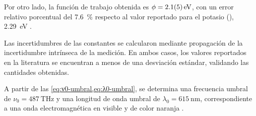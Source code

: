 Por otro lado, la función de trabajo obtenida es \(\phi = \workfunctionexp \),
con un error relativo porcentual del \qty{7.6}{\percent} respecto al valor
reportado para el potasio (), \qty{2.29}{\eV} \cite{holzl-1979}.

Las incertidumbres de las constantes se calcularon mediante propagación de la
incertidumbre intrínseca de la medición. En ambos casos, los valores reportados
en la literatura se encuentran a menos de una desviación estándar, validando
las cantidades obtenidas.

A partir de las \cref{eq:ν0-umbral,eq:λ0-umbral}, se determina una
frecuencia umbral de \(\nu_0 = \qty{487}{\tera\Hz}\) y una longitud de onda
umbral de \(\lambda_0 = \qty{615}{\nano\metre}\), correspondiente a una onda
electromagnética en visible y de color naranja \cite{bruno2005crc}.
